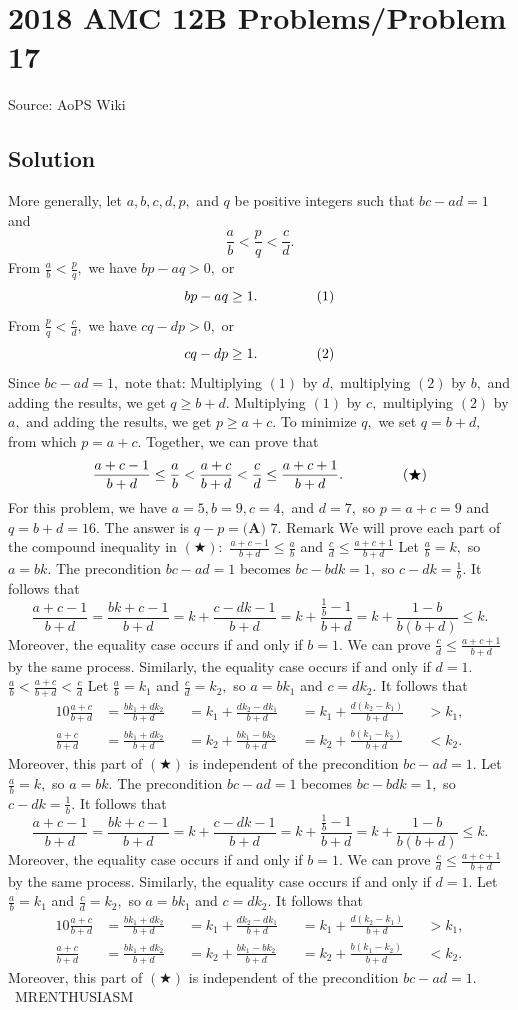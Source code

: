 \documentclass[12pt]{article}
\begin{document}
\section*{{2018 AMC 12B Problems/Problem 17}}
Source: AoPS Wiki

\subsection*{Solution}
More generally, let $a,b,c,d,p,$ and $q$ be positive integers such that $bc-ad=1$ and \[\frac ab < \frac pq < \frac cd.\] From $\frac ab < \frac pq,$ we have $bp-aq>0,$ or \[bp-aq\geq1. \hspace{15mm} (1)\] From $\frac pq < \frac cd,$ we have $cq-dp>0,$ or \[cq-dp\geq1. \hspace{15mm} (2)\] Since $bc-ad=1,$ note that: Multiplying $(1)$ by $d,$ multiplying $(2)$ by $b,$ and adding the results, we get $q\geq b+d.$ Multiplying $(1)$ by $c,$ multiplying $(2)$ by $a,$ and adding the results, we get $p\geq a+c.$ To minimize $q,$ we set $q=b+d,$ from which $p=a+c.$ Together, we can prove that \[\frac{a+c-1}{b+d}\leq\frac ab<\frac{a+c}{b+d}<\frac cd\leq\frac{a+c+1}{b+d}. \hspace{15mm} (\bigstar)\] For this problem, we have $a=5,b=9,c=4,$ and $d=7,$ so $p=a+c=9$ and $q=b+d=16.$ The answer is $q-p=\boxed{\textbf{(A) } 7}.$ Remark We will prove each part of the compound inequality in $(\bigstar):$ $\frac{a+c-1}{b+d}\leq\frac ab$ and $\frac cd\leq\frac{a+c+1}{b+d}$ Let $\frac ab=k,$ so $a=bk.$ The precondition $bc-ad=1$ becomes $bc-bdk=1,$ so $c-dk=\frac1b.$ It follows that \[\frac{a+c-1}{b+d}=\frac{bk+c-1}{b+d}=k+\frac{c-dk-1}{b+d}=k+\frac{\frac1b-1}{b+d}=k+\frac{1-b}{b(b+d)}\leq k.\] Moreover, the equality case occurs if and only if $b=1.$ We can prove $\frac cd\leq\frac{a+c+1}{b+d}$ by the same process. Similarly, the equality case occurs if and only if $d=1.$ $\frac ab<\frac{a+c}{b+d}<\frac cd$ Let $\frac ab=k_1$ and $\frac cd=k_2,$ so $a=bk_1$ and $c=dk_2.$ It follows that \begin{alignat*}{10} \frac{a+c}{b+d}&=\frac{bk_1+dk_2}{b+d}&&=k_1+\frac{dk_2-dk_1}{b+d}&&=k_1+\frac{d(k_2-k_1)}{b+d}&&>k_1, \\ \frac{a+c}{b+d}&=\frac{bk_1+dk_2}{b+d}&&=k_2+\frac{bk_1-bk_2}{b+d}&&=k_2+\frac{b(k_1-k_2)}{b+d}&&<k_2. \end{alignat*} Moreover, this part of $(\bigstar)$ is independent of the precondition $bc-ad=1.$ Let $\frac ab=k,$ so $a=bk.$ The precondition $bc-ad=1$ becomes $bc-bdk=1,$ so $c-dk=\frac1b.$ It follows that \[\frac{a+c-1}{b+d}=\frac{bk+c-1}{b+d}=k+\frac{c-dk-1}{b+d}=k+\frac{\frac1b-1}{b+d}=k+\frac{1-b}{b(b+d)}\leq k.\] Moreover, the equality case occurs if and only if $b=1.$ We can prove $\frac cd\leq\frac{a+c+1}{b+d}$ by the same process. Similarly, the equality case occurs if and only if $d=1.$ Let $\frac ab=k_1$ and $\frac cd=k_2,$ so $a=bk_1$ and $c=dk_2.$ It follows that \begin{alignat*}{10} \frac{a+c}{b+d}&=\frac{bk_1+dk_2}{b+d}&&=k_1+\frac{dk_2-dk_1}{b+d}&&=k_1+\frac{d(k_2-k_1)}{b+d}&&>k_1, \\ \frac{a+c}{b+d}&=\frac{bk_1+dk_2}{b+d}&&=k_2+\frac{bk_1-bk_2}{b+d}&&=k_2+\frac{b(k_1-k_2)}{b+d}&&<k_2. \end{alignat*} Moreover, this part of $(\bigstar)$ is independent of the precondition $bc-ad=1.$ ~MRENTHUSIASM
\end{document}

